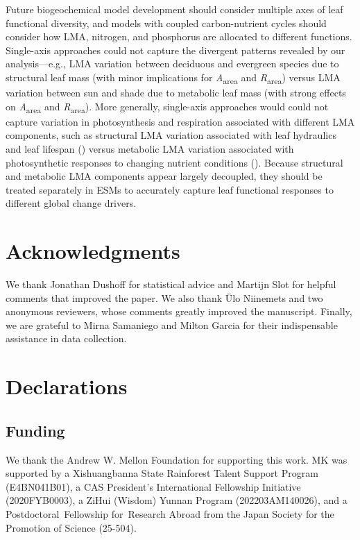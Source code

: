 \documentclass[
  12pt,
  letterpaper,
  DIV=11,
  numbers=noendperiod]{scrartcl}
\begin{document}
Future biogeochemical model development should consider multiple axes of
leaf functional diversity, and models with coupled carbon-nutrient
cycles should consider how LMA, nitrogen, and phosphorus are allocated
to different functions. Single-axis approaches could not capture the
divergent patterns revealed by our analysis---e.g., LMA variation
between deciduous and evergreen species due to structural leaf mass
(with minor implications for \emph{A}\textsubscript{area} and
\emph{R}\textsubscript{area}) versus LMA variation between sun and shade
due to metabolic leaf mass (with strong effects on
\emph{A}\textsubscript{area} and \emph{R}\textsubscript{area}). More
generally, single-axis approaches would could not capture variation in
photosynthesis and respiration associated with different LMA components,
such as structural LMA variation associated with leaf hydraulics and
leaf lifespan () versus
metabolic LMA variation associated with photosynthetic responses to
changing nutrient conditions (). Because structural and metabolic LMA components appear largely
decoupled, they should be treated separately in ESMs to accurately
capture leaf functional responses to different global change drivers.

\section{Acknowledgments}\label{acknowledgments}

We thank Jonathan Dushoff for statistical advice and Martijn Slot for
helpful comments that improved the paper. We also thank Ülo Niinemets
and two anonymous reviewers, whose comments greatly improved the
manuscript. Finally, we are grateful to Mirna Samaniego and Milton
Garcia for their indispensable assistance in data collection.

\section{Declarations}\label{declarations}

\subsection{Funding}\label{funding}

We thank the Andrew W. Mellon Foundation for supporting this work. MK
was supported by a Xishuangbanna State Rainforest Talent Support Program
(E4BN041B01), a CAS President's International Fellowship Initiative
(2020FYB0003), a ZiHui (Wisdom) Yunnan Program (202203AM140026), and a
Postdoctoral~Fellowship for~Research Abroad from the Japan Society for
the Promotion of Science (25-504).
\end{document}
